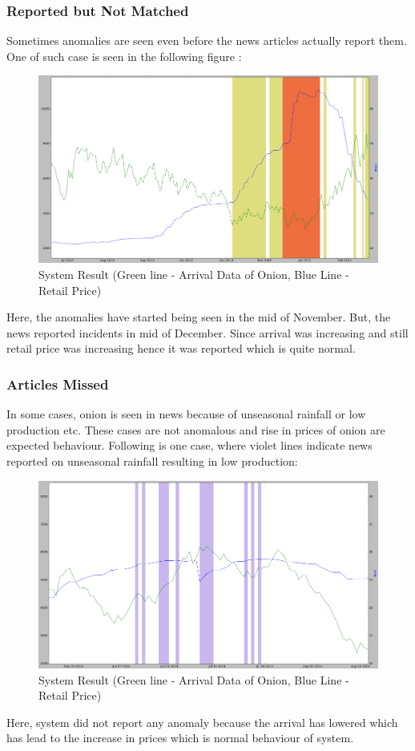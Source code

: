 \subsubsection{Reported but Not Matched}
Sometimes anomalies are seen even before the news articles actually report them. One of such case is seen in the following figure :
\begin{figure}[H]
\centering
\includegraphics[width=1.1\textwidth]{graphs/ReportedNotMatched.png}
\caption{System Result (Green line - Arrival Data of Onion, Blue Line - Retail Price)}
\label{fig:localExample}
\end{figure}

Here, the anomalies have started being seen in the mid of November. But, the news reported incidents in mid of December.  Since arrival was increasing and still retail price was increasing hence it was reported which is quite normal.

\subsubsection{Articles Missed}
In some cases, onion is seen in news because of unseasonal rainfall or low production etc. These cases are not anomalous and rise in prices of onion are expected behaviour. Following is one case, where violet lines indicate news reported on unseasonal rainfall resulting in low production:

\begin{figure}[H]
\centering
\includegraphics[width=1.1\textwidth]{graphs/MissedAnomaly.png}
\caption{System Result (Green line - Arrival Data of Onion, Blue Line - Retail Price)}
\label{fig:localExample}
\end{figure}

Here, system did not report any anomaly because the arrival has lowered which has lead to the increase in prices which is normal behaviour of system. 
